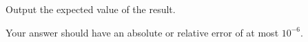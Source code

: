 
    Output the expected value of the result.

    Your answer should have an absolute or relative error of at most $10^{-6}$.
